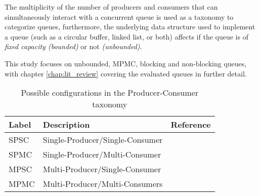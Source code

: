 The multiplicity of the number of producers and
consumers that can simultaneously interact with a concurrent queue is used as a
taxonomy to categorize queues, furthermore, the underlying
data structure used to implement a queue (such as a circular buffer,
linked list, or both) affects if the queue is of \emph{fixed capacity (bounded)} or not
\emph{(unbounded)}. 

This study focuses on unbounded, MPMC, blocking and
non-blocking queues, with chapter \ref{chap:lit_review} covering the evaluated
queues in further detail.

\begin{table*}[h]\centering
\caption{Possible configurations in the Producer-Consumer taxonomy}\label{tab:producer_consumer}
    \begin{tabular}{lll}
        \hline
        Label & Description & Reference \\ \hline
        SPSC & Single-Producer/Single-Consumer & \citep{aldinucci2012efficient} \\
        SPMC & Single-Producer/Multi-Consumer & \citep{arnautov2017ffq} \\
        MPSC & Multi-Producer/Single-Consumer & \\
        MPMC & Multi-Producer/Multi-Consumers & \citep{michael1996simple,valois1994queues,hoffman2007baskets}\\ \hline
    \end{tabular}        
\end{table*}



